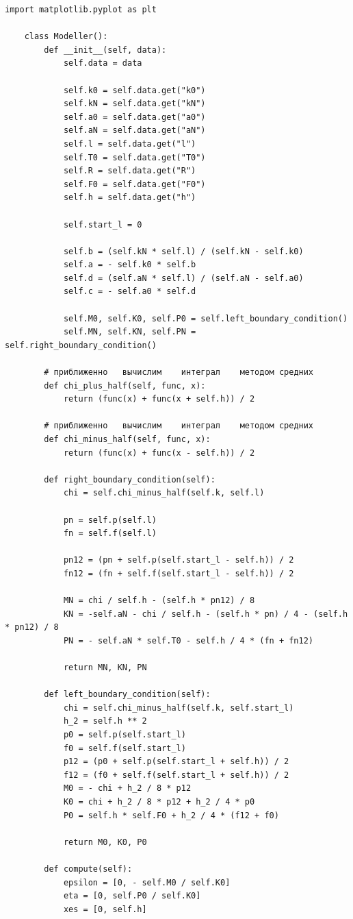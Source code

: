 \documentclass[a4paper,14pt]{article}
\begin{document}
\begin{lstlisting}[label=code1,caption=\text{Класс Modeller.}]
	import matplotlib.pyplot as plt

	class Modeller():
		def __init__(self, data):
			self.data = data
	
			self.k0 = self.data.get("k0")
			self.kN = self.data.get("kN")
			self.a0 = self.data.get("a0")
			self.aN = self.data.get("aN")
			self.l = self.data.get("l")
			self.T0 = self.data.get("T0")
			self.R = self.data.get("R")
			self.F0 = self.data.get("F0")
			self.h = self.data.get("h")
	
			self.start_l = 0
	
			self.b = (self.kN * self.l) / (self.kN - self.k0)
			self.a = - self.k0 * self.b
			self.d = (self.aN * self.l) / (self.aN - self.a0)
			self.c = - self.a0 * self.d
	
			self.M0, self.K0, self.P0 = self.left_boundary_condition()
			self.MN, self.KN, self.PN = self.right_boundary_condition()
	
		# приближенно	вычислим	интеграл	методом	средних
		def chi_plus_half(self, func, x):
			return (func(x) + func(x + self.h)) / 2
		
		# приближенно	вычислим	интеграл	методом	средних
		def chi_minus_half(self, func, x):
			return (func(x) + func(x - self.h)) / 2
	
		def right_boundary_condition(self):
			chi = self.chi_minus_half(self.k, self.l)
	
			pn = self.p(self.l)
			fn = self.f(self.l)
	
			pn12 = (pn + self.p(self.start_l - self.h)) / 2
			fn12 = (fn + self.f(self.start_l - self.h)) / 2
	
			MN = chi / self.h - (self.h * pn12) / 8
			KN = -self.aN - chi / self.h - (self.h * pn) / 4 - (self.h * pn12) / 8
			PN = - self.aN * self.T0 - self.h / 4 * (fn + fn12)
	
			return MN, KN, PN
			
		def left_boundary_condition(self):
			chi = self.chi_minus_half(self.k, self.start_l)
			h_2 = self.h ** 2
			p0 = self.p(self.start_l)
			f0 = self.f(self.start_l)
			p12 = (p0 + self.p(self.start_l + self.h)) / 2
			f12 = (f0 + self.f(self.start_l + self.h)) / 2
			M0 = - chi + h_2 / 8 * p12
			K0 = chi + h_2 / 8 * p12 + h_2 / 4 * p0
			P0 = self.h * self.F0 + h_2 / 4 * (f12 + f0)
	
			return M0, K0, P0
	
		def compute(self):
			epsilon = [0, - self.M0 / self.K0]
			eta = [0, self.P0 / self.K0]
			xes = [0, self.h]
	

\end{lstlisting}
\end{document}
